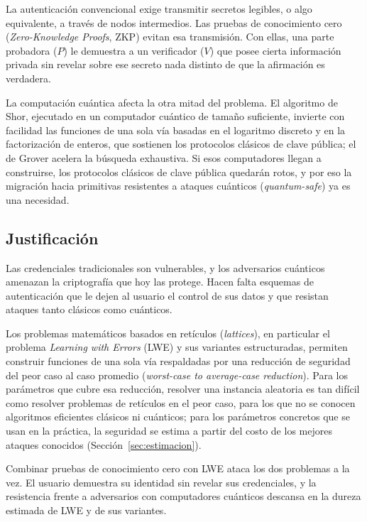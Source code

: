 La autenticación convencional exige transmitir secretos legibles, o algo equivalente, a través de nodos intermedios. Las pruebas de conocimiento cero (\textit{Zero-Knowledge Proofs}, ZKP) evitan esa transmisión. Con ellas, una parte probadora ($P$) le demuestra a un verificador ($V$) que posee cierta información privada sin revelar sobre ese secreto nada distinto de que la afirmación es verdadera.

La computación cuántica afecta la otra mitad del problema. El algoritmo de Shor, ejecutado en un computador cuántico de tamaño suficiente, invierte con facilidad las funciones de una sola vía basadas en el logaritmo discreto y en la factorización de enteros, que sostienen los protocolos clásicos de clave pública; el de Grover acelera la búsqueda exhaustiva. Si esos computadores llegan a construirse, los protocolos clásicos de clave pública quedarán rotos, y por eso la migración hacia primitivas resistentes a ataques cuánticos (\textit{quantum-safe}) ya es una necesidad.

\subsection{Justificación}
Las credenciales tradicionales son vulnerables, y los adversarios cuánticos amenazan la criptografía que hoy las protege. Hacen falta esquemas de autenticación que le dejen al usuario el control de sus datos y que resistan ataques tanto clásicos como cuánticos.

Los problemas matemáticos basados en retículos (\textit{lattices}), en particular el problema \textit{Learning with Errors} (LWE) y sus variantes estructuradas, permiten construir funciones de una sola vía respaldadas por una reducción de seguridad del peor caso al caso promedio (\textit{worst-case to average-case reduction}). Para los parámetros que cubre esa reducción, resolver una instancia aleatoria es tan difícil como resolver problemas de retículos en el peor caso, para los que no se conocen algoritmos eficientes clásicos ni cuánticos; para los parámetros concretos que se usan en la práctica, la seguridad se estima a partir del costo de los mejores ataques conocidos (Sección~\ref{sec:estimacion}).


Combinar pruebas de conocimiento cero con LWE ataca los dos problemas a la vez. El usuario demuestra su identidad sin revelar sus credenciales, y la resistencia frente a adversarios con computadores cuánticos descansa en la dureza estimada de LWE y de sus variantes.

